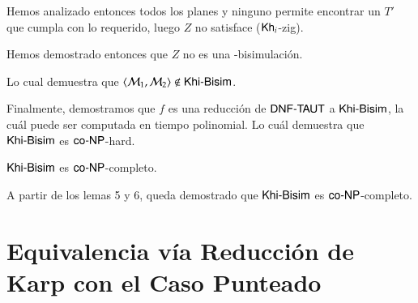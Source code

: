 \begin{demostracion}
\begin{itemize}
    Hemos analizado entonces todos los planes y ninguno permite encontrar un $T'$ que cumpla con lo requerido, 
    luego $Z$ no satisface ($\mathsf{Kh}_i$-zig).

    Hemos demostrado entonces que $Z$ no es una \KHilogic-bisimulación.

    Lo cual demuestra que $\langle \mathcal{M}_1,\mathcal{M}_2 \rangle \not \in \rm\textsf{Khi-Bisim}$.
    \end{itemize}

    Finalmente, demostramos que $f$ es una reducción de $\rm\textsf{DNF-TAUT}$ a $\rm\textsf{Khi-Bisim}$, la cuál puede ser computada en tiempo polinomial. 
    Lo cuál demuestra que $\rm\textsf{Khi-Bisim}$ es $\rm\textsf{co-NP}$-hard.

\end{demostracion}


\begin{teorema}
    $\rm\textsf{Khi-Bisim}$ es $\rm\textsf{co-NP}$-completo.
\end{teorema}


\begin{demostracion}

    A partir de los lemas 5 y 6, queda demostrado que $\rm\textsf{Khi-Bisim}$ es $\rm\textsf{co-NP}$-completo.

\end{demostracion}


\section{Equivalencia vía Reducción de Karp con el Caso Punteado}